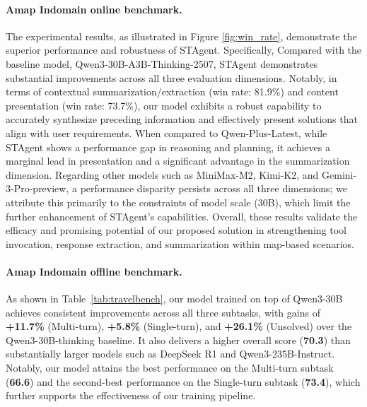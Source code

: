 \documentclass{article} %
\newcommand{\model}{STAgent\xspace}
\begin{document}
\paragraph{Amap Indomain online benchmark.} The experimental results, as illustrated in Figure \ref{fig:win_rate}, demonstrate the superior performance and robustness of \model. Specifically, Compared with the baseline model, Qwen3-30B-A3B-Thinking-2507, \model demonstrates substantial improvements across all three evaluation dimensions. Notably, in terms of contextual summarization/extraction (win rate: 81.9\%) and content presentation (win rate: 73.7\%), our model exhibits a robust capability to accurately synthesize preceding information and effectively present solutions that align with user requirements. When compared to Qwen-Plus-Latest, while \model shows a performance gap in reasoning and planning, it achieves a marginal lead in presentation and a significant advantage in the summarization dimension. Regarding other models such as MiniMax-M2, Kimi-K2, and Gemini-3-Pro-preview, a performance disparity persists across all three dimensions; we attribute this primarily to the constraints of model scale (30B), which limit the further enhancement of \model’s capabilities. Overall, these results validate the efficacy and promising potential of our proposed solution in strengthening tool invocation, response extraction, and summarization within map-based scenarios.


\paragraph{Amap Indomain offline benchmark.} 
As shown in Table~\ref{tab:travelbench}, our model trained on top of Qwen3-30B achieves consistent improvements across all three subtasks, with gains of \textbf{+11.7\%} (Multi-turn), \textbf{+5.8\%} (Single-turn), and \textbf{+26.1\%} (Unsolved) over the Qwen3-30B-thinking baseline. It also delivers a higher overall score (\textbf{70.3}) than substantially larger models such as DeepSeek R1 and Qwen3-235B-Instruct. Notably, our model attains the best performance on the Multi-turn subtask (\textbf{66.6}) and the second-best performance on the Single-turn subtask (\textbf{73.4}), which further supports the effectiveness of our training pipeline.
\end{document}
